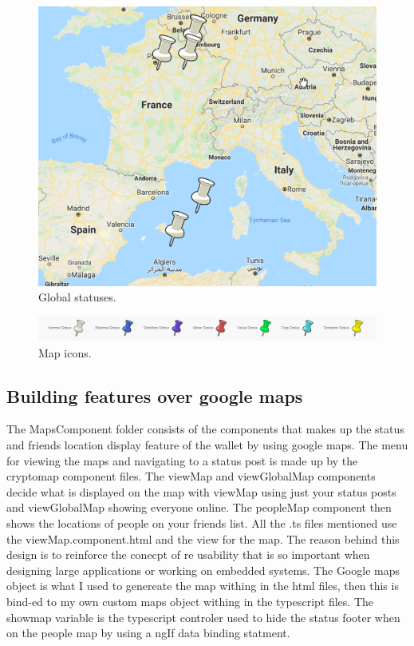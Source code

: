 \begin{figure}[H]
\centering
\includegraphics[]{img/map2.png}
\caption{Global statuses.}
\end{figure}

\begin{figure}[H]
\centering
\includegraphics[]{img/mapfooter.png}
\caption{Map icons.}
\end{figure}

\subsection{Building features over google maps}
The MapsComponent folder consists of the components that makes up the status and friends location display feature of the wallet by using google maps. The menu for viewing the maps and navigating to a status post is made up by the cryptomap component files. The viewMap and viewGlobalMap components decide what is displayed on the map with viewMap using just your status posts and viewGlobalMap showing everyone online. The peopleMap component then shows the locations of people on your friends list. All the .ts files mentioned use the viewMap.component.html and the view for the map. The reason behind this design is to reinforce the conecpt of re usability that is so important when designing large applications or working on embedded systems. The Google maps object is what I used to genereate the map withing in the html files, then this is bind-ed to my own custom maps object withing in the typescript files. The showmap variable is the typescript controler used to hide the status footer when on the people map by using a ngIf data binding statment.

